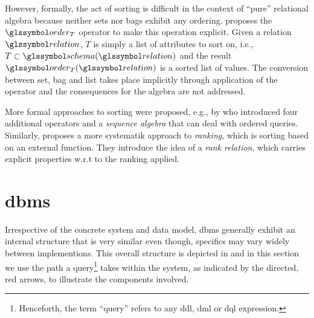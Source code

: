 However, formally, the act of sorting is difficult in the context of ``pure'' relational algebra because neither sets nor bags exhibit any ordering. \cite{Garcia:2009Database} proposes the $\order_T$ operator to make this operation explicit. Given a relation $\relation$, $T$ is simply a list of attributes to sort on, i.e., $T \subset \schema(\relation)$ and the result $\order_T (\relation)$ is a sorted list of values. The conversion between set, bag and list takes place implicitly through application of the operator and the consequences for the algebra are not addressed.

More formal approaches to sorting were proposed, e.g., by \cite{Ramakrsihnan:1998SRQL} who introduced four additional operators and a \emph{sequence algebra} that can deal with ordered queries. Similarly, \cite{Chengkai:2005RankSQL} proposes a more systematik approach to \emph{ranking}, which is sorting based on an external function. They introduce the idea of a \emph{rank relation}, which carries explicit properties w.r.t to the ranking applied.

\pagebreak

\section{\acrfull{dbms}}
Irrespective of the concrete system and data model, \acrshort{dbms} generally exhibit an internal structure that is very similar \cite{Petrov:2019Database,Hellerstein:2007Architecture} even though, specifics may vary widely between implementions. This overall structure is depicted in  and in this section we use the path a query\footnote{Henceforth, the term ``query'' refers to any \acrshort{ddl}, \acrshort{dml} or \acrshort{dql} expression.} takes within the system, as indicated by the directed, red arrows, to illustrate the components involved.

